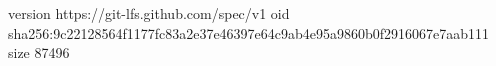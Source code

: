 version https://git-lfs.github.com/spec/v1
oid sha256:9c22128564f1177fc83a2e37e46397e64c9ab4e95a9860b0f2916067e7aab111
size 87496
